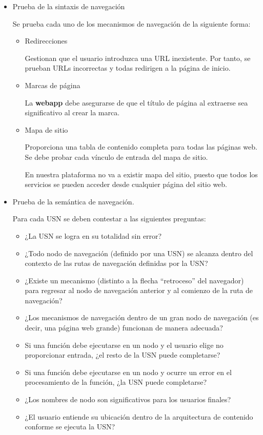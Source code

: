 \begin{itemize}
\item Prueba de la sintaxis de navegación



Se prueba cada uno de los mecanismos de navegación de la siguiente forma:


\begin{itemize}
\item Redirecciones


Gestionan que el usuario introduzca una URL inexistente.  Por tanto, se prueban URLs incorrectas y todas redirigen a la página de inicio.

\item Marcas de página


La \textbf{webapp} debe asegurarse de que el título de página al extraerse sea significativo al crear la marca.

\item Mapa de sitio


Proporciona una tabla de contenido completa para todas las páginas web. Se debe probar cada vínculo de entrada del mapa de sitio.



En nuestra plataforma no va a existir mapa del sitio, puesto que todos los servicios se pueden acceder desde cualquier página del sitio web.


\end{itemize}

\item Prueba de la semántica de navegación.


Para cada USN se deben contestar a las siguientes preguntas:


\begin{itemize}

\item ¿La USN se logra en su totalidad sin error? 
\item ¿Todo nodo de navegación (definido por una USN) se alcanza dentro del contexto de las rutas de navegación definidas por la USN? 
\item ¿Existe un mecanismo (distinto a la flecha ``retroceso'' del navegador) para regresar al nodo de navegación anterior y al comienzo de la ruta de navegación? 
\item ¿Los mecanismos de navegación dentro de un gran nodo de navegación (es decir, una página web grande) funcionan de manera adecuada? 
\item Si una función debe ejecutarse en un nodo y el usuario elige no proporcionar entrada, ¿el resto de la USN puede completarse? 
\item Si una función debe ejecutarse en un nodo y ocurre un error en el procesamiento de la función, ¿la USN puede completarse?
\item ¿Los nombres de nodo son significativos para los usuarios finales? 
\item ¿El usuario entiende su ubicación dentro de la arquitectura de contenido conforme se ejecuta la USN?
\end{itemize}
\end{itemize}

